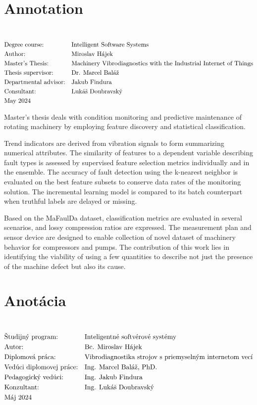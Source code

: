 \thispagestyle{empty}
\section*{Annotation}
\UniversityEN \\
\uppercase{\FacultyEN}
\vspace{-8pt}
{\setlength{\mathindent}{0cm}
\begin{align*}
&\text{Degree course:} && \text{\StudyProgrammeEN} \\
&\text{Author:} && \text{\AuthorEN} \\
&\text{\ThesisEN:} && \text{\TitleEN} \\
&\text{Thesis supervisor:} && \text{\SupervisorEN} \\
&\text{Departmental advisor:} && \text{\DepartmentalAdvisorEN} \\
&\text{Consultant:} && \text{\ConsultantEN} \\
&\text{\DateEN}
\end{align*}}

Master's thesis deals with condition monitoring and predictive maintenance of rotating machinery by employing feature discovery and statistical classification. 

Trend indicators are derived from vibration signals to form summarizing numerical attributes. The similarity of features to a dependent variable describing fault types is assessed by supervised feature selection metrics individually and in the ensemble. The accuracy of fault detection using the k-nearest neighbor is evaluated on the best feature subsets to conserve data rates of the monitoring solution. The incremental learning model is compared to its batch counterpart when truthful labels are delayed or missing. 

Based on the MaFaulDa dataset, classification metrics are evaluated in several scenarios, and lossy compression ratios are expressed. The measurement plan and sensor device are designed to enable collection of novel dataset of machinery behavior for compressors and pumps. The contribution of this work lies in identifying the viability of using a few quantities to describe not just the presence of the machine defect but also its cause.
\emptypage 

\thispagestyle{empty}
\section*{Anotácia}
\University \\
\uppercase{\Faculty}
\vspace{-8pt}
{\setlength{\mathindent}{0cm}
\begin{align*}
&\text{Študijný program:} && \text{\StudyProgramme} \\
&\text{Autor:} && \text{\Author} \\
&\text{\Thesis:} && \text{\Title} \\
&\text{Vedúci diplomovej práce:} && \text{\Supervisor} \\
&\text{Pedagogický vedúci:} && \text{\DepartmentalAdvisor} \\
&\text{Konzultant:} && \text{\Consultant} \\
&\text{\Date}
\end{align*}}

